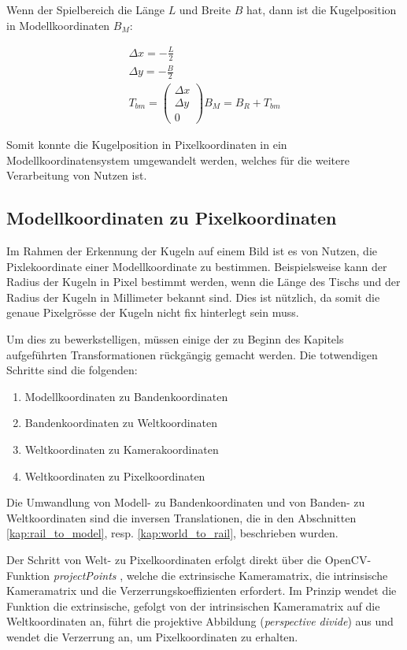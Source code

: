 Wenn der Spielbereich die Länge $L$ und Breite $B$ hat, dann ist die Kugelposition in Modellkoordinaten $B_M$:

\begin{align}
\Delta x = - \frac{L}{2}\\
\Delta y = - \frac{B}{2}\\
T_{bm} = \begin{pmatrix}\Delta x\\\Delta y\\0\end{pmatrix}
B_M = B_R + T_{bm}
\end{align}

Somit konnte die Kugelposition in Pixelkoordinaten in ein Modellkoordinatensystem umgewandelt werden, welches für
die weitere Verarbeitung von Nutzen ist.

\subsection{Modellkoordinaten zu Pixelkoordinaten}\label{kap:model_to_pixel}

Im Rahmen der Erkennung der Kugeln auf einem Bild ist es von Nutzen, die Pixlekoordinate einer Modellkoordinate
zu bestimmen. Beispielsweise kann der Radius der Kugeln in Pixel bestimmt werden, wenn die Länge des Tischs und der Radius
der Kugeln in Millimeter bekannt sind. Dies ist nützlich, da somit die genaue Pixelgrösse der Kugeln nicht fix hinterlegt sein muss.

Um dies zu bewerkstelligen, müssen einige der zu Beginn des Kapitels aufgeführten Transformationen rückgängig gemacht werden.
Die totwendigen Schritte sind die folgenden:
\begin{enumerate}
  \item Modellkoordinaten zu Bandenkoordinaten
  \item Bandenkoordinaten zu Weltkoordinaten
  \item Weltkoordinaten zu Kamerakoordinaten
  \item Weltkoordinaten zu Pixelkoordinaten
\end{enumerate}

Die Umwandlung von Modell- zu Bandenkoordinaten und von Banden- zu Weltkoordinaten sind die inversen Translationen, die
in den Abschnitten \ref{kap:rail_to_model}, resp. \ref{kap:world_to_rail}, beschrieben wurden.

Der Schritt von Welt- zu Pixelkoordinaten erfolgt direkt über die OpenCV-Funktion
\emph{projectPoints} \cite{opencv:projectPoints_function},
welche die extrinsische Kameramatrix, die intrinsische Kameramatrix und die Verzerrungskoeffizienten erfordert.
Im Prinzip wendet die Funktion die extrinsische, gefolgt von der intrinsischen Kameramatrix auf die Weltkoordinaten an,
führt die projektive Abbildung (\emph{perspective divide}) aus und wendet die Verzerrung an, um Pixelkoordinaten zu erhalten.

